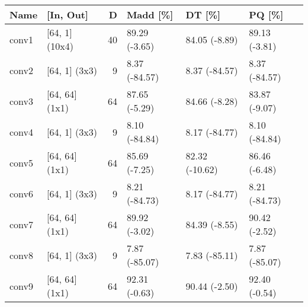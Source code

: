 \begin{tabular}{llrlll}
\toprule
 Name &      [In, Out] &  D &      Madd [\%] &         DT [\%] &        PQ [\%] \\
\midrule
conv1 & [64, 1] (10x4) & 40 & 89.29 (-3.65) &  84.05 (-8.89) & 89.13 (-3.81) \\
conv2 &  [64, 1] (3x3) &  9 & 8.37 (-84.57) &  8.37 (-84.57) & 8.37 (-84.57) \\
conv3 & [64, 64] (1x1) & 64 & 87.65 (-5.29) &  84.66 (-8.28) & 83.87 (-9.07) \\
conv4 &  [64, 1] (3x3) &  9 & 8.10 (-84.84) &  8.17 (-84.77) & 8.10 (-84.84) \\
conv5 & [64, 64] (1x1) & 64 & 85.69 (-7.25) & 82.32 (-10.62) & 86.46 (-6.48) \\
conv6 &  [64, 1] (3x3) &  9 & 8.21 (-84.73) &  8.17 (-84.77) & 8.21 (-84.73) \\
conv7 & [64, 64] (1x1) & 64 & 89.92 (-3.02) &  84.39 (-8.55) & 90.42 (-2.52) \\
conv8 &  [64, 1] (3x3) &  9 & 7.87 (-85.07) &  7.83 (-85.11) & 7.87 (-85.07) \\
conv9 & [64, 64] (1x1) & 64 & 92.31 (-0.63) &  90.44 (-2.50) & 92.40 (-0.54) \\
\bottomrule
\end{tabular}
